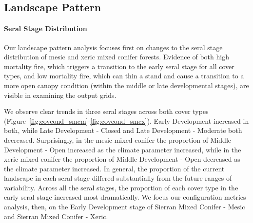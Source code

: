 \documentclass[12pt]{article}
\begin{document}
\begin{spacing}{1}
\subsection*{Landscape Pattern}

\paragraph{Seral Stage Distribution} Our landscape pattern analysis focuses first on changes to the seral stage distribution of mesic and xeric mixed conifer forests. Evidence of both high mortality fire, which triggers a transition to the early seral stage for all cover types, and low mortality fire, which can thin a stand and cause a transition to a more open canopy condition (within the middle or late developmental stages), are visible in examining the output grids. 

We observe clear trends in three seral stages across both cover types (Figure~\ref{fig:covcond_smcm}-\ref{fig:covcond_smcx}). Early Development increased in both, while Late Development - Closed and Late Development - Moderate both decreased. Surprisingly, in the mesic mixed conifer the proportion of Middle Development - Open increased as the climate parameter increased, while in the xeric mixed conifer the proportion of Middle Development - Open decreased as the climate parameter increased. In general, the proportion of the current landscape in each seral stage differed substantially from the future ranges of variability. Across all the seral stages, the proportion of each cover type in the early seral stage increased most dramatically. We focus our configuration metrics analysis, then, on the Early Development stage of Sierran Mixed Conifer - Mesic and Sierran Mixed Conifer - Xeric.




\end{spacing}
\end{document}

